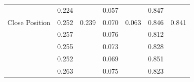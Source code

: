 \documentclass[conference]{IEEEtran}
\begin{document}
\begin{table}[]
\begin{tabular}{|l|cc|cc|cc|}
                                                      & \multicolumn{1}{c|}{\cellcolor[HTML]{FFFFFF}0.224} & \cellcolor[HTML]{FFFFFF}                         & \multicolumn{1}{c|}{\cellcolor[HTML]{FFFFFF}0.057}  & \cellcolor[HTML]{FFFFFF}                           & \multicolumn{1}{c|}{\cellcolor[HTML]{FFFFFF}0.847} & \cellcolor[HTML]{FFFFFF}                        \\ \cline{2-2} \cline{4-4} \cline{6-6}
  \multirow{-5}{*}{Close Position}                & \multicolumn{1}{c|}{\cellcolor[HTML]{FFFFFF}0.252} & \multirow{-5}{*}{\cellcolor[HTML]{FFFFFF}0.239} & \multicolumn{1}{c|}{\cellcolor[HTML]{FFFFFF}0.070} & \multirow{-5}{*}{\cellcolor[HTML]{FFFFFF}0.063} & \multicolumn{1}{c|}{\cellcolor[HTML]{FFFFFF}0.846} & \multirow{-5}{*}{\cellcolor[HTML]{FFFFFF}0.841} \\ \hline
                                                      & \multicolumn{1}{c|}{\cellcolor[HTML]{FFFFFF}0.257} & \cellcolor[HTML]{FFFFFF}                         & \multicolumn{1}{c|}{\cellcolor[HTML]{FFFFFF}0.076} & \cellcolor[HTML]{FFFFFF}                           & \multicolumn{1}{c|}{\cellcolor[HTML]{FFFFFF}0.812} & \cellcolor[HTML]{FFFFFF}                        \\ \cline{2-2} \cline{4-4} \cline{6-6}
                                                      & \multicolumn{1}{c|}{\cellcolor[HTML]{FFFFFF}0.255} & \cellcolor[HTML]{FFFFFF}                         & \multicolumn{1}{c|}{\cellcolor[HTML]{FFFFFF}0.073} & \cellcolor[HTML]{FFFFFF}                           & \multicolumn{1}{c|}{\cellcolor[HTML]{FFFFFF}0.828} & \cellcolor[HTML]{FFFFFF}                        \\ \cline{2-2} \cline{4-4} \cline{6-6}
                                                      & \multicolumn{1}{c|}{\cellcolor[HTML]{FFFFFF}0.252} & \cellcolor[HTML]{FFFFFF}                         & \multicolumn{1}{c|}{\cellcolor[HTML]{FFFFFF}0.069} & \cellcolor[HTML]{FFFFFF}                           & \multicolumn{1}{c|}{\cellcolor[HTML]{FFFFFF}0.851} & \cellcolor[HTML]{FFFFFF}                        \\ \cline{2-2} \cline{4-4} \cline{6-6}
                                                      & \multicolumn{1}{c|}{\cellcolor[HTML]{FFFFFF}0.263} & \cellcolor[HTML]{FFFFFF}                         & \multicolumn{1}{c|}{\cellcolor[HTML]{FFFFFF}0.075} & \cellcolor[HTML]{FFFFFF}                           & \multicolumn{1}{c|}{\cellcolor[HTML]{FFFFFF}0.823} & \cellcolor[HTML]{FFFFFF}                        \\ \cline{2-2} \cline{4-4} \cline{6-6}

\end{tabular}
\end{table}
\end{document}
